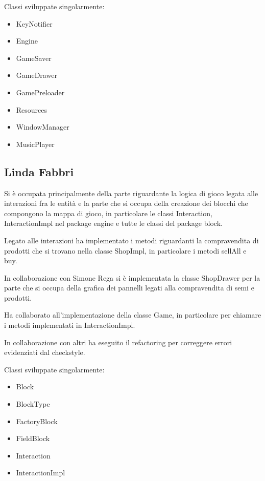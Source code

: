 \documentclass[a4paper,12pt]{report}
\begin{document}
\hfill\break
Classi sviluppate singolarmente:
{
\begin{itemize}
	\item KeyNotifier
	\item Engine
	\item GameSaver
	\item GameDrawer
	\item GamePreloader
	\item Resources
	\item WindowManager
	\item MusicPlayer
\end{itemize}
}

\subsection{Linda Fabbri}

Si è occupata principalmente della parte riguardante la logica di gioco legata alle interazioni fra le entità e la parte che si occupa della creazione dei blocchi che compongono la mappa di gioco, in particolare le classi Interaction, InteractionImpl nel package engine e tutte le classi del package block. 

Legato alle interazioni ha implementato i metodi riguardanti la compravendita di prodotti che si trovano nella classe ShopImpl, in particolare i metodi sellAll e buy. 

In collaborazione con Simone Rega si è implementata la classe ShopDrawer per la parte che si occupa della grafica dei pannelli legati alla compravendita di semi e prodotti. 

Ha collaborato all’implementazione della classe Game, in particolare per chiamare i metodi implementati in InteractionImpl. 

In collaborazione con altri ha eseguito il refactoring per correggere errori evidenziati dal checkstyle.

\hfill\break
Classi sviluppate singolarmente:
{
	\begin{itemize}
		\item Block
		\item BlockType
		\item FactoryBlock
		\item FieldBlock
		\item Interaction
		\item InteractionImpl
	\end{itemize}
}
\hfill\break
\end{document}
